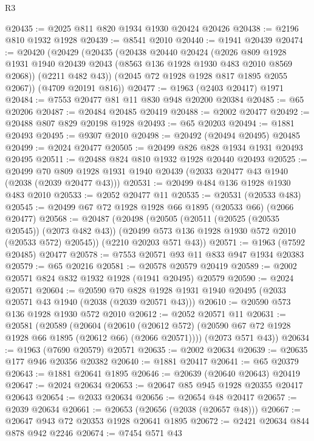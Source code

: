 \begin{lexlean}{R3}
\begin{coremodule}
@20435 := @2025 @811 @820 @1934 @1930 @20424 @20426
@20438 := @2196 @810 @1932 @1928
@20439 := @8541 @2010
@20440 := @1941 @20439
@20474 := @20420
    (@20429
      (@20435
        (@20438
          @20440
          @20424
          (@2026
            @809
            @1928
            @1931
            @1940
            @20439
            @2043
            (@8563 @136 @1928 @1930 @483 @2010 @8569 @2068))
          (@2211 @482 @43))
        (@2045 @72 @1928 @1928 @817 @1895 @2055 @2067))
      (@4709 @20191 @816))
@20477 := @1963 (@2403 @20417) @1971
@20484 := @7553 @20477 @81 @11 @830 @948 @20200 @20384
@20485 := @65 @20206
@20487 := @20484 @20485 @20419
@20488 := @2002 @20477
@20492 := @20488 @807 @829 @20198 @1928
@20493 := @65 @20203
@20494 := @1881 @20493
@20495 := @9307 @2010
@20498 := @20492 (@20494 @20495) @20485
@20499 := @2024 @20477
@20505 := @20499 @826 @828 @1934 @1931 @20493 @20495
@20511 := @20488 @824 @810 @1932 @1928 @20440 @20493
@20525 := @20499
    @70
    @809
    @1928
    @1931
    @1940
    @20439
    (@2033 @20477 @43 @1940 (@2038 (@2039 @20477 @43)))
@20531 := @20499 @484 @136 @1928 @1930 @483 @2010
@20533 := @2052 @20477 @11
@20535 := @20531 (@20533 @483)
@20545 := @20499 @67 @72 @1928 @1928 @66 @1895 (@20533 @66) (@2066 @20477)
@20568 := @20487
    (@20498
      (@20505
        (@20511 (@20525 (@20535 @20545)) (@2073 @482 @43))
        (@20499 @573 @136 @1928 @1930 @572 @2010 (@20533 @572) @20545))
      (@2210 @20203 @571 @43))
@20571 := @1963 (@7592 @20485) @20477
@20578 := @7553 @20571 @93 @11 @833 @947 @1934 @20383
@20579 := @65 @20216
@20581 := @20578 @20579 @20419
@20589 := @2002 @20571 @824 @832 @1932 @1928 (@1941 @20495) @20579
@20590 := @2024 @20571
@20604 := @20590
    @70
    @828
    @1928
    @1931
    @1940
    @20495
    (@2033 @20571 @43 @1940 (@2038 (@2039 @20571 @43)))
@20610 := @20590 @573 @136 @1928 @1930 @572 @2010
@20612 := @2052 @20571 @11
@20631 := @20581
    (@20589
      (@20604
        (@20610 (@20612 @572) (@20590 @67 @72 @1928 @1928 @66 @1895 (@20612 @66) (@2066 @20571))))
      (@2073 @571 @43))
@20634 := @1963 (@7690 @20579) @20571
@20635 := @2002 @20634
@20639 := @20635 @177 @946 @20356 @20382
@20640 := @1881 @20417
@20641 := @65 @20379
@20643 := @1881 @20641 @1895
@20646 := @20639 (@20640 @20643) @20419
@20647 := @2024 @20634
@20653 := @20647 @85 @945 @1928 @20355 @20417 @20643
@20654 := @2033 @20634
@20656 := @20654 @48 @20417
@20657 := @2039 @20634
@20661 := @20653 (@20656 (@2038 (@20657 @48)))
@20667 := @20647 @943 @72 @20353 @1928 @20641 @1895
@20672 := @2421 @20634 @844 @878 @942 @2246
@20674 := @7454 @571 @43

\end{coremodule}
\end{lexlean}
